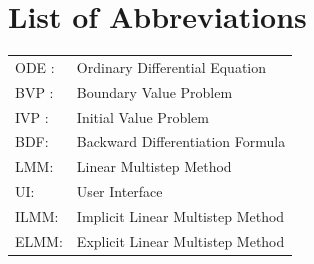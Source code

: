\documentclass[a4paper, twoside]{report} %
\begin{document}
\tableofcontents

\listoffigures
{}

\listoftables
{}

\chapter*{List of Abbreviations}
\begin{tabular}{ll}
    ODE : & Ordinary Differential Equation \\
    BVP : & Boundary Value Problem \\
    IVP : & Initial Value Problem \\
    BDF: &Backward Differentiation Formula \\
    LMM: &Linear Multistep Method \\
    UI: &User Interface \\
    ILMM:& Implicit Linear Multistep Method \\
    ELMM: & Explicit Linear Multistep Method
\end{tabular}

\clearpage
{}








 
\end{document}
